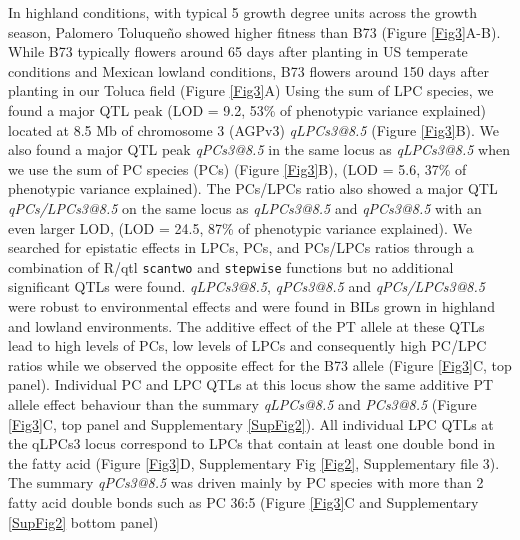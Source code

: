 \documentclass[9pt,twocolumn,twoside,lineno]{BioRxiv}
\def\code#1{\texttt{#1}}
\begin{document}
In highland conditions, with typical 5 growth degree units across the growth season, Palomero Toluqueño showed higher fitness than B73 (Figure \ref{Fig3}A-B).
While B73 typically flowers around 65 days after planting in US temperate conditions and Mexican lowland conditions, B73 flowers around 150 days after planting in our Toluca field (Figure \ref{Fig3}A)
Using the sum of LPC species, we found a major QTL peak (LOD = 9.2, 53\% of phenotypic variance explained) located at 8.5 Mb of chromosome 3 (AGPv3)  \textit{qLPCs3@8.5} (Figure \ref{Fig3}B).
We also found a major QTL peak \textit{qPCs3@8.5} in the same locus as  \textit{qLPCs3@8.5} when we use the sum of PC species (PCs) (Figure \ref{Fig3}B), (LOD = 5.6, 37\% of phenotypic variance explained). 
The PCs/LPCs ratio also showed a major QTL \textit{qPCs/LPCs3@8.5} on the same locus as  \textit{qLPCs3@8.5} and \textit{qPCs3@8.5} with an even larger LOD, (LOD = 24.5, 87\% of phenotypic variance explained).
We searched for epistatic effects in LPCs, PCs, and PCs/LPCs ratios through a combination of R/qtl \code{scantwo} and \code{stepwise} functions \cite{Broman2003-ac} but no additional significant QTLs were found.
\textit{qLPCs3@8.5}, \textit{qPCs3@8.5} and \textit{qPCs/LPCs3@8.5}  were robust to environmental effects and were found in BILs grown in highland and lowland environments.
The additive effect of the PT allele at these QTLs lead to high levels of PCs, low levels of LPCs and consequently high PC/LPC ratios while we observed the opposite effect for the B73 allele (Figure \ref{Fig3}C, top panel).
Individual PC and LPC QTLs at this locus show the same additive PT allele effect behaviour than the summary \textit{qLPCs@8.5} and \textit{PCs3@8.5} (Figure \ref{Fig3}C, top panel and Supplementary \ref{SupFig2}).
All individual LPC QTLs at the qLPCs3 locus correspond to LPCs that contain at least one double bond in the fatty acid (Figure  \ref{Fig3}D, Supplementary Fig \ref{Fig2}, Supplementary file 3).
The summary \textit{qPCs3@8.5} was driven mainly by PC species with more than 2 fatty acid double bonds such as PC 36:5 (Figure \ref{Fig3}C and Supplementary \ref{SupFig2} bottom panel)
\end{document}
